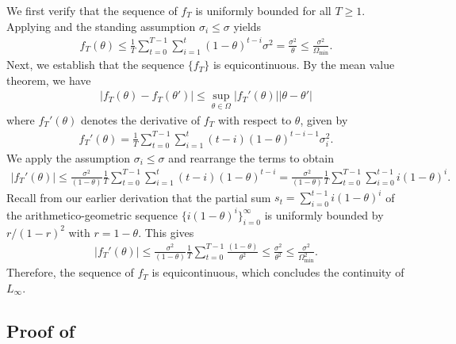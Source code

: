 \documentclass[a4paper, 11pt]{article}
\theoremstyle{definition}
\begin{document}
We first verify that the sequence of $f_T$ is uniformly bounded for all $T \ge 1$. 
Applying  and the standing assumption $\sigma_i \le \sigma$ yields
\begin{align}
    f_T(\theta) \le \frac{1}{T} \sum_{t=0}^{T-1} \sum_{i=1}^{t} (1 - \theta)^{t-i} \sigma^2 = \frac{\sigma^2}{\theta} \le \frac{\sigma^2}{\Omega_{\text{min}}}  .
\end{align}
Next, we establish that the sequence $\{f_T\}$ is equicontinuous. 
By the mean value theorem, we have
\begin{align}
    | f_T(\theta) - f_T(\theta') | \le \sup_{\theta \in \Omega} | f_T'(\theta) | | \theta - \theta' | 
\end{align}
where $f_T'(\theta)$ denotes the derivative of $f_T$ with respect to $\theta$, given by
\begin{align}
    f_T'(\theta) = \frac{1}{T} \sum_{t=0}^{T-1} \sum_{i=1}^{t} (t-i) (1 - \theta)^{t-i-1} \sigma_i^2 .
\end{align}
We apply the assumption $\sigma_i \le \sigma$ and rearrange the terms to obtain
\begin{align}
    | f_T'(\theta) | \le \frac{\sigma^2}{(1 - \theta)} \frac{1}{T} \sum_{t=0}^{T-1} \sum_{i=1}^{t} (t-i) (1 - \theta)^{t-i} = \frac{\sigma^2}{(1 - \theta)} \frac{1}{T} \sum_{t=0}^{T-1} \sum_{i=0}^{t-1} i (1 - \theta)^{i} .
\end{align}
Recall from our earlier derivation that the partial sum $s_t = \sum_{i=0}^{t-1} i (1 - \theta)^i$ of the arithmetico-geometric sequence $\{i (1 - \theta)^i \}_{i=0}^{\infty}$ is uniformly bounded by $r / (1 - r)^2$ with $r = 1 - \theta$.
This gives
\begin{align}
    | f_T'(\theta) | \le \frac{\sigma^2}{(1 - \theta)} \frac{1}{T} \sum_{t=0}^{T-1} \frac{(1 - \theta)}{ \theta^2 } \le \frac{\sigma^2}{\theta^2} \le \frac{\sigma^2}{\Omega_{\text{min}}^2} .
\end{align}
Therefore, the sequence of $f_T$ is equicontinuous, which concludes the continuity of $L_\infty$.



\subsection{Proof of } \label{apx:proof_consistency}
\end{document}
